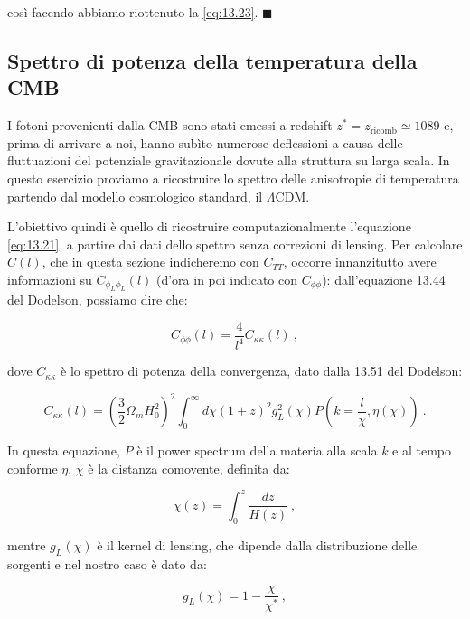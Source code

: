 \documentclass[a4paper,10pt]{article}
\begin{document}
così facendo abbiamo riottenuto la \eqref{eq:13.23}. \hfill $\blacksquare$




\subsection{Spettro di potenza della temperatura della CMB}

I fotoni provenienti dalla CMB sono stati emessi a redshift $z^* = z_{\text{ricomb}} \simeq 1089$ e, prima di arrivare a noi, hanno subìto numerose deflessioni a causa delle fluttuazioni del potenziale gravitazionale dovute alla struttura su larga scala.
In questo esercizio proviamo a ricostruire lo spettro delle anisotropie di temperatura partendo dal modello cosmologico standard, il $\Lambda$CDM.

L'obiettivo quindi è quello di ricostruire computazionalmente l'equazione \eqref{eq:13.21}, a partire dai dati dello spettro senza correzioni di lensing.
Per calcolare $C(l)$, che in questa sezione indicheremo con $C_{TT}$, occorre innanzitutto avere informazioni su $C_{\phi_L \phi_L}(l)$ (d'ora in poi indicato con $C_{\phi\phi}$): dall'equazione 13.44 del Dodelson, possiamo dire che:

\begin{equation} \label{eq:CKK}
    C_{\phi\phi}(l) = \frac{4}{l^4} C_{\kappa\kappa}(l) \ ,
\end{equation}

dove $C_{\kappa\kappa}$ è lo spettro di potenza della convergenza, dato dalla 13.51 del Dodelson:

\begin{equation}
	C_{\kappa\kappa} (l) = \left(\frac32\Omega_mH_0^2\right)^2 \int_0^\infty d\chi (1+z)^2 g_L^2(\chi) P \left( k=\frac{l}{\chi},\eta(\chi) \right) \ .
\end{equation}

In questa equazione, $P$ è il power spectrum della materia alla scala $k$ e al tempo conforme $\eta$, $\chi$ è la distanza comovente, definita da:

\begin{equation}
    \chi(z) = \int_0^z \frac{dz}{H(z)} \ ,
\end{equation}

mentre $g_L(\chi)$ è il kernel di lensing, che dipende dalla distribuzione delle sorgenti e nel nostro caso è dato da:

\begin{equation}
    g_L(\chi) = 1 - \frac{\chi}{\chi^*} \ ,
\end{equation}
\end{document}
